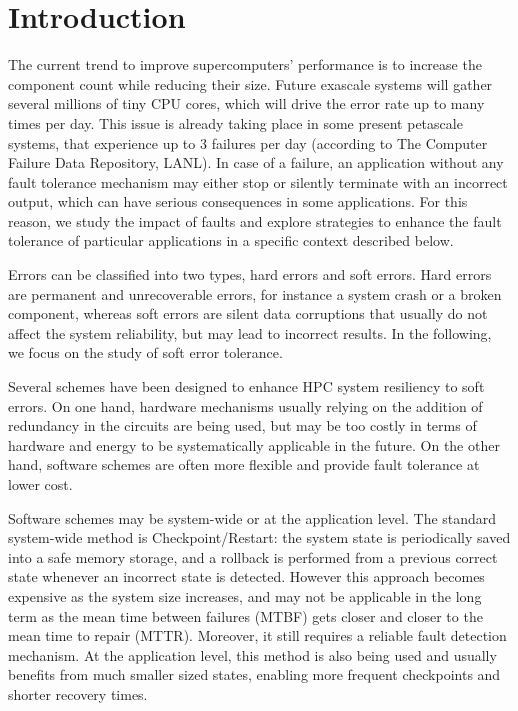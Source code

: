 \section{Introduction}

	The current trend to improve supercomputers' performance is to increase the component count while reducing their size. Future exascale systems will gather several millions of tiny CPU cores, which will drive the error rate up to many times per day. This issue is already taking place in some present petascale systems, that experience up to 3 failures per day (according to The Computer Failure Data Repository\cite{CFDR}, LANL). In case of a failure, an application without any fault tolerance mechanism may either stop or silently terminate with an incorrect output, which can have serious consequences in some applications. For this reason, we study the impact of faults and explore strategies to enhance the fault tolerance of particular applications in a specific context described below. 
  
  	Errors can be classified into two types, hard errors and soft errors. Hard errors are permanent and unrecoverable errors, for instance a system crash or a broken component, whereas soft errors are silent data corruptions that usually do not affect the system reliability, but may lead to incorrect results. In the following, we focus on the study of soft error tolerance.
  
	Several schemes have been designed to enhance HPC system resiliency to soft errors. On one hand, hardware mechanisms usually relying on the addition of redundancy in the circuits are being used, but may be too costly in terms of hardware and energy to be systematically applicable in the future. On the other hand, software schemes are often more flexible and provide fault tolerance at lower cost.
    
    Software schemes may be system-wide or at the application level. The standard system-wide method is Checkpoint/Restart: the system state is periodically saved into a safe memory storage, and a rollback is performed from a previous correct state whenever an incorrect state is detected. However this approach becomes expensive as the system size increases,  and may not be applicable in the long term as the mean time between failures (MTBF) gets closer and closer to the mean time to repair (MTTR). Moreover, it still requires a reliable fault detection mechanism. At the application level, this method is also being used and usually benefits from much smaller sized states, enabling more frequent checkpoints and shorter recovery times.
    
